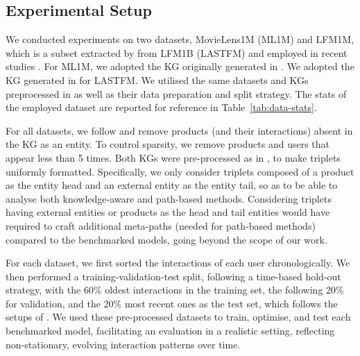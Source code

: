 \documentclass[sigconf]{acmart}
\begin{document}
\subsection{Experimental Setup}
\label{sec:exp-setup}
 We conducted experiments on two datasets, MovieLens1M (ML1M) \cite{ml1m} and LFM1M, which is a subset extracted by \cite{10.1007/978-3-031-28241-6_1} from LFM1B (LASTFM) \cite{lastfm-dataset} and employed in recent studies \cite{10.1145/3523227.3547374, 10.1145/3605357}. 
For ML1M, we adopted the KG originally generated in \cite{CaoWHHC19}. We adopted the KG generated in \cite{Wang00LC19} for LASTFM. We utilised the same datasets and KGs preprocessed in \cite{10.1007/978-3-031-28241-6_1} as well as their data preparation and split strategy. The stats of the employed dataset are reported for reference in Table~\ref{tab:data-stats}.

For all datasets, we follow \cite{10.1145/3523227.3547374} and remove products (and their interactions) absent in the KG as an entity. To control sparsity, we remove products and users that appear less than 5 times. 
Both KGs were pre-processed as in \cite{10.1145/3523227.3547374}, to make triplets uniformly formatted. 
Specifically, we only consider triplets composed of a product as the entity head and an external entity as the entity tail, so as to be able to analyse both knowledge-aware and path-based methods. Considering triplets having external entities or products as the head and tail entities would have required to craft additional meta-paths (needed for path-based methods) compared to the benchmarked models, going beyond the scope of our work. 

For each dataset, we first sorted the interactions of each user chronologically. 
We then performed a training-validation-test split, following a time-based hold-out strategy, with the 60\% oldest interactions in the training set, the following 20\% for validation, and the 20\% most recent ones as the test set, which follows the setups of \cite{10.1145/3477495.3532041, 10.1007/978-3-031-28241-6_1}. 
We used these pre-processed datasets to train, optimise, and test each benchmarked model, facilitating an evaluation in a realistic setting, reflecting non-stationary, evolving interaction patterns over time.
\end{document}
